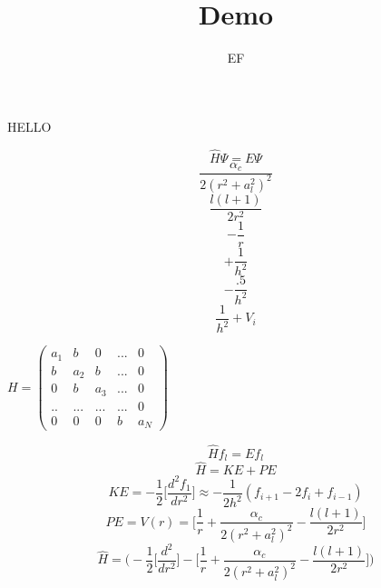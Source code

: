 \documentclass[10pt,a4paper]{article}
\title{Demo}
\author{EF}
\begin{document}
	\maketitle
	HELLO
	
	\[\hat{H}\Psi = E\Psi\]
	\[\frac{\alpha_c}{2(r^2 + a_l^2)^2} \]
	\[\frac{l(l+1)}{2r^2} \]
	\[-\frac{1}{r}\]
	\[+\frac{1}{h^2}\]
	\[-\frac{.5}{h^2}\]
	\[\frac{1}{h^2} + V_{i}\]
	

	$H=\begin{pmatrix}
	 	a_1 & b & 0 & ... & 0\\
	 	b & a_2 & b & ... & 0\\
	 	0 & b & a_3 & ... & 0\\
	 	.. & ... & ... & ... & 0\\
	 	0 & 0 & 0 & b & a_N
	\end{pmatrix}$


\[\hat{H}f_{l}=Ef_{l}\]
\[\hat{H}=KE+PE\]
\[KE=-\frac{1}{2}\biggl[\frac{d^2f_1}{dr^2}\biggr] \approx -\frac{1}{2h^2}(f_{i+1}-2f_{i}+f_{i-1})\]
\[PE = V(r) =\biggl[\frac{1}{r}+\frac{\alpha_c}{2(r^2+a_{l}^2)^2}-\frac{l(l+1)}{2r^2} \biggr] \]
\[\hat{H}=\Biggl(-\frac{1}{2}\biggl[\frac{d^2}{dr^2}\biggr]-\biggl[\frac{1}{r}+\frac{\alpha_c}{2(r^2+a_{l}^2)^2}-\frac{l(l+1)}{2r^2} \biggr]\Biggr) \]
\end{document}
